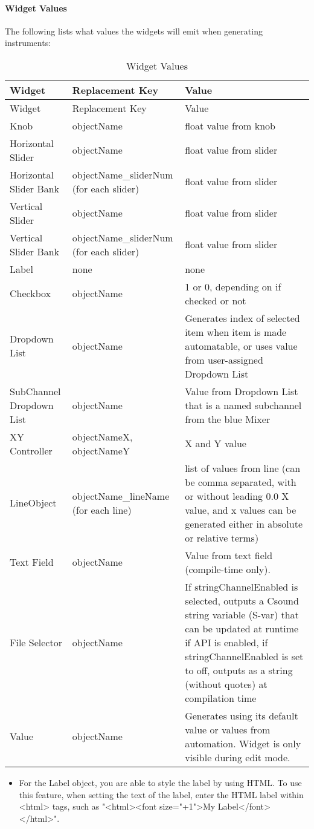 \paragraph{Widget Values}

The following lists what values the widgets will emit when generating
instruments:

\begin{longtable}[]{@{}lll@{}}
\caption{Widget Values}\tabularnewline
\toprule
Widget & Replacement Key & Value\tabularnewline
\midrule
\endfirsthead
\toprule
Widget & Replacement Key & Value\tabularnewline
\midrule
\endhead
Knob & objectName & float value from knob\tabularnewline
Horizontal Slider & objectName & float value from slider\tabularnewline
Horizontal Slider Bank & objectName\_sliderNum (for each slider) & float
value from slider\tabularnewline
Vertical Slider & objectName & float value from slider\tabularnewline
Vertical Slider Bank & objectName\_sliderNum (for each slider) & float
value from slider\tabularnewline
Label & none & none\tabularnewline
Checkbox & objectName & 1 or 0, depending on if checked or
not\tabularnewline
Dropdown List & objectName & Generates index of selected item when item
is made automatable, or uses value from user-assigned Dropdown
List\tabularnewline
SubChannel Dropdown List & objectName & Value from Dropdown List that is
a named subchannel from the blue Mixer\tabularnewline
XY Controller & objectNameX, objectNameY & X and Y value\tabularnewline
LineObject & objectName\_lineName (for each line) & list of values from
line (can be comma separated, with or without leading 0.0 X value, and x
values can be generated either in absolute or relative
terms)\tabularnewline
Text Field & objectName & Value from text field (compile-time
only).\tabularnewline
File Selector & objectName & If stringChannelEnabled is selected,
outputs a Csound string variable (S-var) that can be updated at runtime
if API is enabled, if stringChannelEnabled is set to off, outputs as a
string (without quotes) at compilation time\tabularnewline
Value & objectName & Generates using its default value or values from
automation. Widget is only visible during edit mode.\tabularnewline
\bottomrule
\end{longtable}

\begin{itemize}
\item
  For the Label object, you are able to style the label by using HTML.
  To use this feature, when setting the text of the label, enter the
  HTML label within \textless{}html\textgreater{} tags, such as
  "\textless{}html\textgreater{}\textless{}font
  size="+1"\textgreater{}My
  Label\textless{}/font\textgreater{}\textless{}/html\textgreater{}".
\end{itemize}

